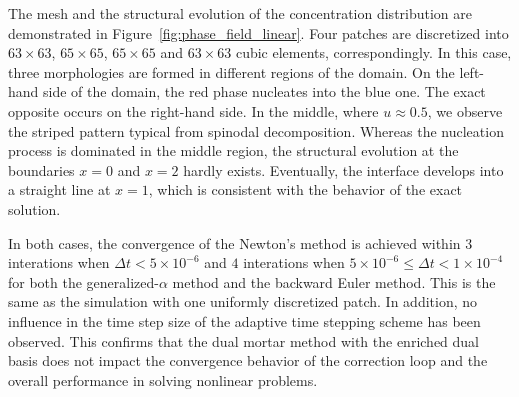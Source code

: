 The mesh and the structural evolution of the concentration distribution are demonstrated in Figure~\ref{fig:phase_field_linear}. Four patches are discretized into $63 \times 63$, $65 \times 65$, $65 \times 65$ and $63 \times 63$ cubic elements, correspondingly. In this case, three morphologies are formed in different regions of the domain. On the left-hand side of the domain, the red phase nucleates into the blue one. The exact opposite occurs on the right-hand side. In the middle, where $u\approx 0.5$, we observe the striped pattern typical from spinodal decomposition. Whereas the nucleation process is dominated in the middle region, the structural evolution at the boundaries $x = 0$ and $x = 2$ hardly exists. Eventually, the interface develops into a straight line at $x = 1$, which is consistent with the behavior of the exact solution.\par

In both cases, the convergence of the Newton's method is achieved within $3$ interations when $\Delta t<5\times 10^{-6}$ and $4$ interations when $5\times 10^{-6} \leq \Delta t < 1\times 10^{-4}$ for both the generalized-$\alpha$ method and the backward Euler method. This is the same as the simulation with one uniformly discretized patch. In addition, no influence in the time step size of the adaptive time stepping scheme has been observed. This confirms that the dual mortar method with the enriched dual basis does not impact the convergence behavior of the correction loop and the overall performance in solving nonlinear problems.

